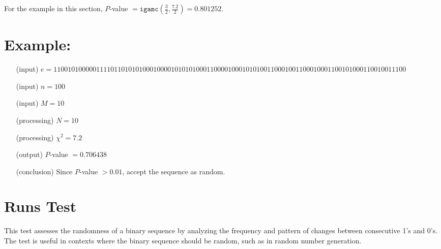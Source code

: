 \documentclass[12pt,openany]{book}
\theoremstyle{definition}
\begin{document}
	For the example in this section, \( P \)-value \( = \texttt{igamc} \left( \frac{3}{2}, \frac{7.2}{2} \right) = 0.801252 \).
	
	\section*{Example:}
	\begin{itemize}
		\item[(input)] \( e = 110010100000111101101010100010000101010100011000010001010100110001001100010001100101000110010011100 \)
		\item[(input)] \( n = 100 \)
		\item[(input)] \( M = 10 \)
		\item[(processing)] \( N = 10 \)
		\item[(processing)] \( \chi^2 = 7.2 \)
		\item[(output)] \( P \)-value \( = 0.706438 \)
		\item[(conclusion)] Since \( P \)-value \( > 0.01 \), accept the sequence as random.
	\end{itemize}

\newpage
	\section{Runs Test}
	
	This test assesses the randomness of a binary sequence by analyzing the frequency and pattern of changes between consecutive 1's and 0's. The test is useful in contexts where the binary sequence should be random, such as in random number generation.
	
\end{document}
